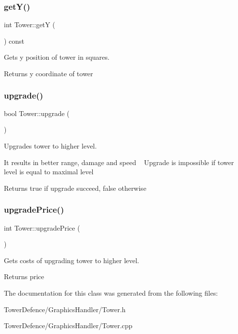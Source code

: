 \subsubsection{\texorpdfstring{get\+Y()}{getY()}}
{\footnotesize\ttfamily int Tower\+::getY (\begin{DoxyParamCaption}{ }\end{DoxyParamCaption}) const}



Gets y position of tower in squares. 

\begin{DoxyReturn}{Returns}
y coordinate of tower 
\end{DoxyReturn}
\mbox{\label{class_tower_a831ac6bf0ec549c6e5296bcc16fa1a00}} 
\subsubsection{\texorpdfstring{upgrade()}{upgrade()}}
{\footnotesize\ttfamily bool Tower\+::upgrade (\begin{DoxyParamCaption}{ }\end{DoxyParamCaption})}



Upgrades tower to higher level. 

It results in better range, damage and speed ~\newline
Upgrade is impossible if tower level is equal to maximal level \begin{DoxyReturn}{Returns}
true if upgrade succeed, false otherwise 
\end{DoxyReturn}
\mbox{\label{class_tower_a90246de79aad5204b3c9ecd8aafec6e9}} 
\subsubsection{\texorpdfstring{upgrade\+Price()}{upgradePrice()}}
{\footnotesize\ttfamily int Tower\+::upgrade\+Price (\begin{DoxyParamCaption}{ }\end{DoxyParamCaption})}



Gets costs of upgrading tower to higher level. 

\begin{DoxyReturn}{Returns}
price 
\end{DoxyReturn}


The documentation for this class was generated from the following files\+:\begin{DoxyCompactItemize}
\item 
Tower\+Defence/\+Graphics\+Handler/Tower.\+h\item 
Tower\+Defence/\+Graphics\+Handler/Tower.\+cpp\end{DoxyCompactItemize}
